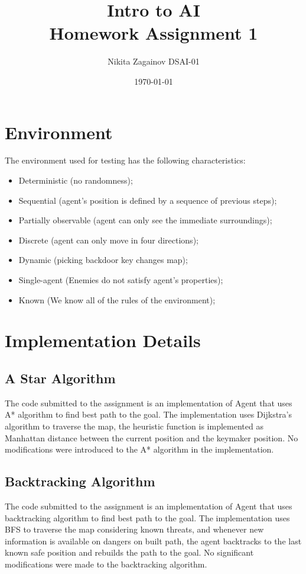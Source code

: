 \documentclass[12pt]{article}
\title{Intro to AI \\ Homework Assignment 1}
\author{Nikita Zagainov DSAI-01}
\date{\today}
\begin{document}
\maketitle

\section{Environment}
The environment used for testing has the following characteristics:
\begin{itemize}
    \item Deterministic (no randomness);
    \item Sequential (agent's position is defined by a sequence of previous steps);
    \item Partially observable (agent can only see the immediate surroundings);
    \item Discrete (agent can only move in four directions);
    \item Dynamic (picking backdoor key changes map);
    \item Single-agent (Enemies do not satisfy agent's properties);
    \item Known (We know all of the rules of the environment);
\end{itemize}
\section{Implementation Details}
\subsection{A Star Algorithm}
The code submitted to the assignment is an implementation of Agent that uses A*
algorithm to find best path to the goal. The implementation uses Dijkstra's
algorithm to traverse the map, the heuristic function is implemented as
Manhattan distance between the current position and the keymaker position. No
modifications were introduced to the A* algorithm in the implementation.

\subsection{Backtracking Algorithm}
The code submitted to the assignment is an implementation of Agent that uses
backtracking algorithm to find best path to the goal. The implementation uses
BFS to traverse the map considering known threats, and whenever new information
is available on dangers on built path, the agent backtracks to the last known
safe position and rebuilds the path to the goal. No significant modifications
were made to the backtracking algorithm.
\end{document}
